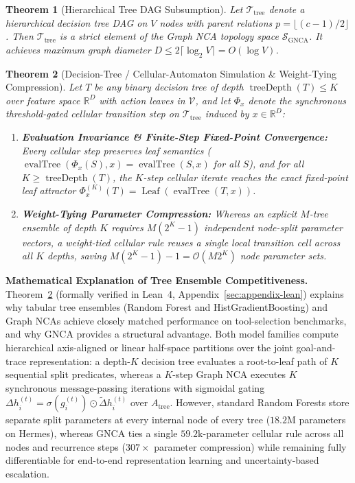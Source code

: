\documentclass[10pt,twocolumn,letterpaper]{article}
\newtheorem{theorem}{Theorem}
\begin{document}
\begin{theorem}[Hierarchical Tree DAG Subsumption]\label{thm:tree-subsumption}
Let $\mathcal{T}_{\mathrm{tree}}$ denote a hierarchical decision tree DAG on $V$ nodes with parent relations $p = \lfloor (c-1)/2 \rfloor$. Then $\mathcal{T}_{\mathrm{tree}}$ is a strict element of the Graph NCA topology space $\mathcal{S}_{\mathrm{GNCA}}$. It achieves maximum graph diameter $D \le 2 \lceil \log_2 V \rceil = O(\log V)$.
\end{theorem}

\begin{theorem}[Decision-Tree / Cellular-Automaton Simulation \& Weight-Tying Compression]\label{thm:tree-nca-duality}
Let $T$ be any binary decision tree of depth $\operatorname{treeDepth}(T) \le K$ over feature space $\mathbb{R}^D$ with action leaves in $\mathcal{V}$, and let $\Phi_x$ denote the synchronous threshold-gated cellular transition step on $\mathcal{T}_{\mathrm{tree}}$ induced by $x \in \mathbb{R}^D$:
\begin{enumerate}[leftmargin=1.5em, itemsep=0.05em]
  \item \textbf{Evaluation Invariance \& Finite-Step Fixed-Point Convergence:} Every cellular step preserves leaf semantics ($\operatorname{evalTree}(\Phi_x(S), x) = \operatorname{evalTree}(S, x)$ for all $S$), and for all $K \ge \operatorname{treeDepth}(T)$, the $K$-step cellular iterate reaches the exact fixed-point leaf attractor $\Phi_x^{(K)}(T) = \operatorname{Leaf}(\operatorname{evalTree}(T, x))$.
  \item \textbf{Weight-Tying Parameter Compression:} Whereas an explicit $M$-tree ensemble of depth $K$ requires $M(2^K - 1)$ independent node-split parameter vectors, a weight-tied cellular rule reuses a single local transition cell across all $K$ depths, saving $M(2^K - 1) - 1 = \mathcal{O}(M 2^K)$ node parameter sets.
\end{enumerate}
\end{theorem}

\noindent\textbf{Mathematical Explanation of Tree Ensemble Competitiveness.} Theorem~\ref{thm:tree-nca-duality} (formally verified in Lean~4, Appendix~\ref{sec:appendix-lean}) explains why tabular tree ensembles (Random Forest and HistGradientBoosting) and Graph NCAs achieve closely matched performance on tool-selection benchmarks, and why GNCA provides a structural advantage. Both model families compute hierarchical axis-aligned or linear half-space partitions over the joint goal-and-trace representation: a depth-$K$ decision tree evaluates a root-to-leaf path of $K$ sequential split predicates, whereas a $K$-step Graph NCA executes $K$ synchronous message-passing iterations with sigmoidal gating $\Delta h_i^{(t)} = \sigma(g_i^{(t)}) \odot \tilde{\Delta} h_i^{(t)}$ over $A_{\text{tree}}$. However, standard Random Forests store separate split parameters at every internal node of every tree ($18.2\text{M}$ parameters on Hermes), whereas GNCA ties a single $59.2\text{k}$-parameter cellular rule across all nodes and recurrence steps ($307\times$ parameter compression) while remaining fully differentiable for end-to-end representation learning and uncertainty-based escalation.
\end{document}
